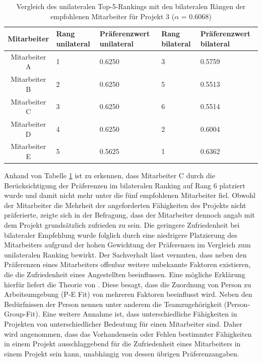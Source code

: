 \begin{table}[htbp]
    \begin{center}
    \begin{tabular}{c|p{0.7in}|p{0.95in}|p{0.7in}|p{0.95in}}
    {\textbf{Mitarbeiter}} & {\textbf{Rang unilateral}} & {\textbf{Präferenzwert unilateral}} & {\textbf{Rang bilateral}} & {\textbf{Präferenzwert bilateral}} \\
    \hline
	Mitarbeiter A & \hfil1 & \hfil0.6250 & \hfil3 & \hfil0.5759 \\
    \hline
    Mitarbeiter B & \hfil2 & \hfil0.6250 & \hfil5 & \hfil0.5513 \\
    \hline
	Mitarbeiter C & \hfil3 & \hfil0.6250 & \hfil6 & \hfil0.5514 \\
    \hline
	Mitarbeiter D & \hfil4 & \hfil0.6250 & \hfil2 & \hfil0.6004 \\
    \hline
	Mitarbeiter E & \hfil5 & \hfil0.5625 & \hfil1 & \hfil0.6362 \\
    \end{tabular}
    \end{center}
    \caption[Vergleich des unilateralen Top-5-Rankings mit den bilateralen Rängen der empfohlenen Mitarbeiter für Projekt 3 ($\alpha$ = 0.6068)]{Vergleich des unilateralen Top-5-Rankings mit den bilateralen Rängen der empfohlenen Mitarbeiter für Projekt 3 ($\alpha$ = 0.6068)}
	\label{tab:diskussion:tab1}
\end{table}

Anhand von Tabelle \ref{tab:diskussion:tab1} ist zu erkennen, dass Mitarbeiter C durch die Berücksichtigung der Präferenzen im bilateralen Ranking auf Rang 6 platziert wurde und damit nicht mehr unter die fünf empfohlenen Mitarbeiter fiel.
Obwohl der Mitarbeiter die Mehrheit der angeforderten Fähigkeiten des Projekts nicht präferierte, zeigte sich in der Befragung, dass der Mitarbeiter dennoch angab mit dem Projekt grundsätzlich zufrieden zu sein.
Die geringere Zufriedenheit bei bilateraler Empfehlung wurde folglich durch eine niedrigere Platzierung des Mitarbeiters aufgrund der hohen Gewichtung der Präferenzen im Vergleich zum unilateralen Ranking bewirkt.
Der Sachverhalt lässt vermuten, dass neben den Präferenzen eines Mitarbeiters offenbar weitere unbekannte Faktoren existieren, die die Zufriedenheit eines Angestellten beeinflussen.
Eine mögliche Erklärung hierfür liefert die Theorie von \textcite[S. 1ff.]{malinowski:2006}.
Diese besagt, dass die Zuordnung von Person zu Arbeitsumgebung (\ac{P-E Fit}) von mehreren Faktoren beeinflusst wird.
Neben den Bedürfnissen der Person nennen \textcite[S. 1ff.]{malinowski:2006} unter anderem die Teamzugehörigkeit (Person-Group-Fit).
Eine weitere Annahme ist, dass unterschiedliche Fähigkeiten in Projekten von unterschiedlicher Bedeutung für einen Mitarbeiter sind.
Daher wird angenommen, dass das Vorhandensein oder Fehlen bestimmter Fähigkeiten in einem Projekt ausschlaggebend für die Zufriedenheit eines Mitarbeiters in einem Projekt sein kann, unabhängig von dessen übrigen Präferenzangaben.

